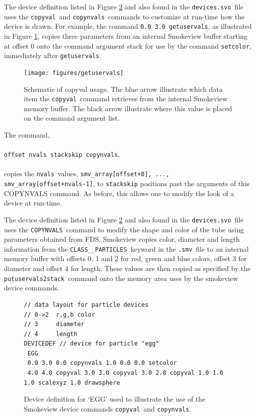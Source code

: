 \documentclass[11pt,twoside]{book}
\newcommand{\figoptions}{hbp}
\newcommand{\hitem}[1]{\item[{\bf #1} \hfill]}
\begin{document}
The device definition listed in Figure \ref{figeggexample} and also found in the {\tt devices.svo}\ file uses the {\tt copyval}\ and {\tt copynvals}\ commands to customize at run-time how the device is drawn.  For example, the command
{\tt 0.0 3.0 getuservals}, as illustrated in Figure \ref{figgetuservals}, copies three parameters from an internal Smokeview buffer starting at offset 0 onto the command argument stack for use by the command {\tt setcolor}, immediately after {\tt getuservals}.


\begin{figure}[\figoptions]
\begin{center}
\texttt{[image: figures/getuservals]}\\
\end{center}
\caption[Schematic of copyval usage.]{Schematic of copyval usage. 
The blue arrow illustrate which data item the {\tt copyval}\ command retrieves from the internal Smokeview memory buffer.  The black arrow illustrate where this value is placed 
on the command argument list.
}
 \label{figgetuservals}
\end{figure}

\hitem{COPYNVALS} The command,\\
 \\
 {\tt offset nvals stackskip copynvals}, \\
 \\
copies the {\tt nvals}\ values, {\tt smv\_array[offset+0], ..., smv\_array[offset+nvals-1]},
to {\tt stackskip} positions past the arguments of this COPYNVALS command.  As before, this allows one to modify
the look of a device at run-time.

The device definition listed in Figure \ref{figeggexample} and also found in the {\tt devices.svo}\ file uses the {\tt COPYNVALS}\
command to modify the shape and color of the tube using parameters obtained from FDS.  Smokeview copies color, diameter and length information from the {\tt CLASS\_\_PARTICLES}\ keyword in the {\tt .smv}\ file to an internal memory buffer with offsets 0, 1 and 2 for red, green and blue colors, offset 3 for diameter and offset 4 for length.  These values are then copied as specified by the {\tt putuservals2stack}\ command onto the memory area uses by the smokeview device commands.

\begin{figure}[\figoptions]
\begin{verbatim}
// data layout for particle devices
// 0->2  r,g,b color
// 3     diameter
// 4     length
DEVICEDEF // device for particle "egg"
 EGG
 0.0 3.0 0.0 copynvals 1.0 0.0 0.0 setcolor
 4.0 4.0 copyval 3.0 3.0 copyval 3.0 2.0 copyval 1.0 1.0 1.0 scalexyz 1.0 drawsphere
\end{verbatim}
\caption{Device definition for `EGG' used to illustrate the use of the Smokeview device commands {\tt copyval}\ and {\tt copynvals}.}
 \label{figeggexample}
\end{figure}
\end{document}
